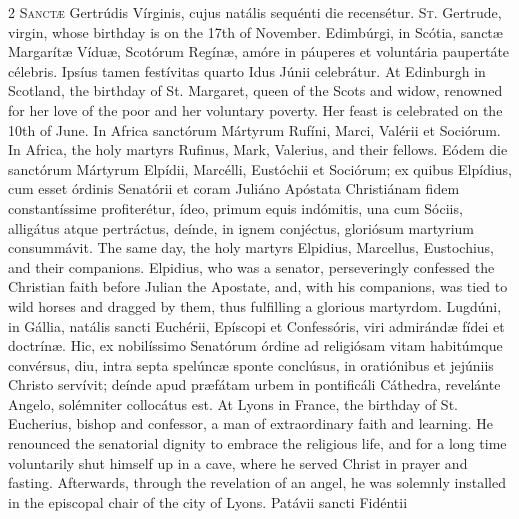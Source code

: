\begin{paracol}{2}
\lettrine[lines=2]{S}{anctæ} Gertrúdis 
 Vírginis, cujus natális sequénti die recensétur.
\switchcolumn
{}
\lettrine[lines=2]{S}{t.} Gertrude, virgin, whose birthday 
 is on the 17th of November.
\switchcolumn*
{}
Edimbúrgi, in Scótia, sanctæ Margarítæ Víduæ, Scotórum Regínæ, amóre in páuperes et voluntária 
 paupertáte célebris. Ipsíus tamen festívitas quarto Idus Júnii 
 celebrátur.
\switchcolumn
{}
At Edinburgh in Scotland, the 
 birthday of St. Margaret, queen of the Scots and widow, renowned for her 
 love of the poor and her voluntary poverty. Her feast is celebrated on 
 the 10th of June.
\switchcolumn*
{}
In Africa sanctórum 
 Mártyrum Rufíni, Marci, Valérii et Sociórum.
\switchcolumn
{}
In Africa, the holy martyrs Rufinus, 
 Mark, Valerius, and their fellows.
\switchcolumn*
{}
Eódem die sanctórum 
 Mártyrum Elpídii, Marcélli, Eustóchii et Sociórum; ex quibus Elpídius, cum 
 esset órdinis Senatórii et coram Juliáno Apóstata Christiánam fidem 
 constantíssime profiterétur, ídeo, primum equis indómitis, una cum Sóciis, 
 alligátus atque pertráctus, deínde, in ignem conjéctus, gloriósum martyrium 
 consummávit.
\switchcolumn
{}
The same day, the holy martyrs 
 Elpidius, Marcellus, Eustochius, and their companions. Elpidius, who 
 was a senator, perseveringly confessed the Christian faith before Julian the 
 Apostate, and, with his companions, was tied to wild horses and dragged by 
 them, thus fulfilling a glorious martyrdom.
\switchcolumn*
{}
Lugdúni, in Gállia, 
 natális sancti Euchérii, Epíscopi et Confessóris, viri admirándæ fídei et 
 doctrínæ. Hic, ex nobilíssimo Senatórum órdine ad religiósam vitam 
 habitúmque convérsus, diu, intra septa spelúncæ sponte conclúsus, in 
 oratiónibus et jejúniis Christo servívit; deínde apud præfátam urbem in 
 pontificáli Cáthedra, revelánte Angelo, solémniter collocátus est.
\switchcolumn
{}
At Lyons in France, the birthday of 
 St. Eucherius, bishop and confessor, a man of extraordinary faith and 
 learning. He renounced the senatorial dignity to embrace the religious 
 life, and for a long time voluntarily shut himself up in a cave, where he 
 served Christ in prayer and fasting. Afterwards, through the 
 revelation of an angel, he was solemnly installed in the episcopal chair of 
 the city of Lyons.
\switchcolumn*
{}
Patávii sancti Fidéntii 

\end{paracol}
